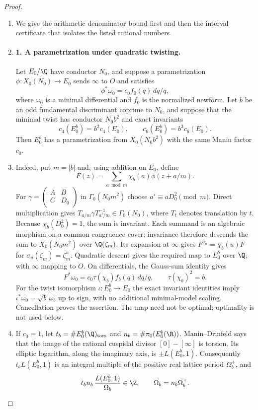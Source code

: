 \begin{proof}
\begin{enumerate}[label=\arabic*.,leftmargin=*]
\item We give the arithmetic denominator bound first and then the interval
certificate that isolates the listed rational numbers.

\item \paragraph{1. A parametrization under quadratic twisting.}
Let $E_0/\Q$ have conductor $N_0$, and suppose a parametrization
$\phi:X_0(N_0)\to E_0$ sends $\infty$ to $O$ and satisfies
\[
 \phi^*\omega_0=c_0f_0(q)\,dq/q,
\]
where $\omega_0$ is a minimal differential and $f_0$ is the normalized
newform. Let $b$ be an odd fundamental discriminant coprime to $N_0$,
and suppose that the minimal twist has conductor $N_0b^2$ and exact
invariants
\[
 c_4(E_0^b)=b^2c_4(E_0),\qquad
 c_6(E_0^b)=b^3c_6(E_0).
\]
Then $E_0^b$ has a parametrization from $X_0(N_0b^2)$ with the same
Manin factor $c_0$.

\item Indeed, put $m=|b|$ and, using addition on $E_0$, define
\[
 F(z)=\sum_{a\bmod m}\chi_b(a)\phi(z+a/m).
\]
For $\gamma=\left(\begin{smallmatrix}A&B\\C&D_0\end{smallmatrix}\right)$
in $\Gamma_0(N_0m^2)$ choose $a'\equiv aD_0^2\pmod m$.
Direct multiplication gives
$T_{a/m}\gamma T_{a'/m}^{-1}\in\Gamma_0(N_0)$, where $T_t$
denotes translation by $t$. Because $\chi_b(D_0^2)=1$, the sum is
invariant. Each summand is an algebraic morphism on a common
congruence cover; invariance therefore descends the sum to
$X_0(N_0m^2)$ over $\Q(\zeta_m)$. Its expansion at $\infty$
gives $F^{\sigma_u}=\chi_b(u)F$ for
$\sigma_u(\zeta_m)=\zeta_m^u$. Quadratic descent gives the required
map to $E_0^b$ over $\Q$, with $\infty$ mapping to $O$.
On differentials, the Gauss-sum identity gives
\[
 F^*\omega_0=c_0\tau(\chi_b)f_b(q)\,dq/q,
 \qquad \tau(\chi_b)^2=b.
\]
For the twist isomorphism $\iota:E_0^b\to E_0$ the exact invariant
identities imply
$\iota^*\omega_0=\sqrt b\,\omega_b$ up to sign, with no additional
minimal-model scaling. Cancellation proves the assertion. The map
need not be optimal; optimality is not used below.

\item If $c_0=1$, let $t_b=\#E_0^b(\Q)_{\rm tors}$ and
$n_b=\#\pi_0(E_0^b(\R))$. Manin--Drinfeld says that the image of
the rational cuspidal divisor $[0]-[\infty]$ is torsion. Its elliptic
logarithm, along the imaginary axis, is $\pm L(E_0^b,1)$.
Consequently $t_bL(E_0^b,1)$ is an integral multiple of the positive
real lattice period $\Omega_b^+$, and
\begin{equation}\label{ari:eq:Cgz-central-integrality}
 t_bn_b\,\frac{L(E_0^b,1)}{\Omega_b}\in\Z,
 \qquad \Omega_b=n_b\Omega_b^+.
\end{equation}


\end{enumerate}
\end{proof}
